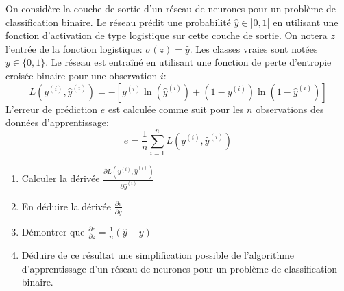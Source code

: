\documentclass[]{../exercices}
\begin{document}
	\begin{exercice}
		On considère la couche de sortie d'un réseau de neurones pour un problème de classification binaire. Le réseau prédit une probabilité $\hat{y} \in ]0, 1[$ en utilisant une fonction d'activation de type logistique sur cette couche de sortie. On notera $z$ l'entrée de la fonction logistique: $\sigma(z) = \hat{y}$. Les classes vraies sont notées $y \in \{0, 1\}$. Le réseau est entraîné en utilisant une fonction de perte d'entropie croisée binaire pour une observation $i$:
		\begin{equation*}
			L(y^{(i)}, \hat{y}^{(i)}) = - \left[ y^{(i)} \ln(\hat{y}^{(i)}) + (1 - y^{(i)}) \ln(1 - \hat{y}^{(i)}) \right]
		\end{equation*}
		L'erreur de prédiction $e$ est calculée comme suit pour les $n$ observations des données d'apprentissage:
		\begin{equation*}
			e = \frac{1}{n} \sum_{i=1}^n L(y^{(i)}, \hat{y}^{(i)})
		\end{equation*}
		\begin{enumerate}
			\item Calculer la dérivée $\frac{\partial{L(y^{(i)}, \hat{y}^{(i)})}}{\partial{\hat{y}^{(i)}}}$
			\item En déduire la dérivée $\frac{\partial{e}}{\partial{\hat{y}}}$
			\item Démontrer que $\frac{\partial{e}}{\partial{z}} = \frac{1}{n}\left(\hat{y} - y\right)$
			\item Déduire de ce résultat une simplification possible de l'algorithme d'apprentissage d'un réseau de neurones pour un problème de classification binaire.
		\end{enumerate}
	\end{exercice}
\end{document}
